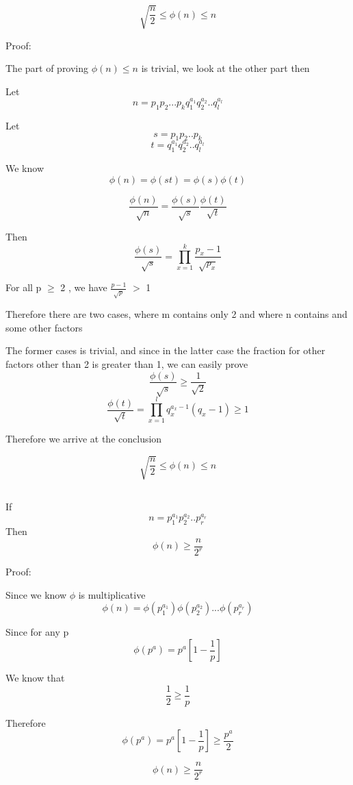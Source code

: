\documentclass{article}
\begin{document}
\[
    \sqrt{\frac{n}{2}} \leq \phi(n) \leq n
\]

Proof:

The part of proving \(\phi(n) \leq n \) is trivial, we look at the other part then

Let
\[
    n = p_1 p_2 . . . p_k q_1^{a_1} q_2^{a_2} . . q_l^{a_l}
\]

Let 
\[
    s = p_1 p_2 . . p _k
\]
\[
    t = q_1^{a_1} q_2^{a_2} . . q_l^{a_l}
\]

We know
\[
    \phi(n) = \phi(st) = \phi(s)\phi(t)
\]

\[
    \frac{\phi(n)}{\sqrt{n}} = \frac{\phi(s)}{\sqrt{s}} \frac{\phi(t)}{\sqrt{t}}
\]

Then
\[
    \frac{\phi(s)}{\sqrt{s}} = \prod_{x=1}^{k} \frac{p_x - 1}{\sqrt{p_x}}
\]

For all p \(\geq\) 2 , we have \(\frac{p - 1}{\sqrt{p}}\) \(>\) 1

Therefore there are two cases, where m contains only 2 and where n contains  and some other factors

The former cases is trivial, and since in the latter case the fraction for other \indent factors other than 2 is greater than 1, we can easily prove
\[
    \frac{\phi(s)}{\sqrt{s}} \geq \frac{1}{\sqrt{2}}
\]
\[
    \frac{\phi(t)}{\sqrt{t}} = \prod_{x=1}^{l} q_x^{a_x - 1} (q_x - 1) \geq 1
\]

Therefore we arrive at the conclusion

\[
    \sqrt{\frac{n}{2}} \leq \phi(n) \leq n
\]

\subsection{}
If 
\[
    n = p_1^{a_1} p_2^{a_2} . . p_r^{a_r}
\]
Then
\[
    \phi(n) \geq \frac{n}{2^r}
\]

Proof:

Since we know \(\phi\) is multiplicative
\[
    \phi(n) = \phi(p_1^{a_1}) \phi(p_2^{a_2}) . . . \phi(p_r^{a_r})
\]

Since for any p
\[
    \phi(p^{a}) = p^a [1 - \frac{1}{p}]
\]

We know that
\[
    \frac{1}{2} \geq \frac{1}{p}
\]

Therefore
\[
    \phi(p^a) = p^a [1 - \frac{1}{p}] \geq \frac{p^a}{2}
\]

\[
    \phi(n) \geq \frac{n}{2^r}
\]


\subsection{}
\end{document}
